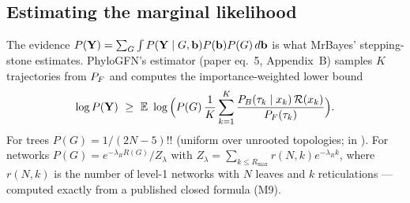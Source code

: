 \subsection{Estimating the marginal likelihood}
The evidence $P(\mathbf{Y})=\sum_G\int P(\mathbf{Y}\mid G,\mathbf{b})P(\mathbf{b})P(G)\,d\mathbf{b}$ is what MrBayes' stepping-stone estimates. PhyloGFN's estimator (paper eq.~5, Appendix~B) samples $K$ trajectories from $P_F$ and computes the importance-weighted lower bound
\begin{equation}\label{eq:mll}
\log P(\bY)\ \ge\ \mathbb E\ \log\Big(P(G)\,\frac1K\sum_{k=1}^K\frac{\PB(\tau_k\mid x_k)\,\R(x_k)}{\PF(\tau_k)}\Big).
\end{equation}
For trees $P(G)=1/(2N-5)!!$ (uniform over unrooted topologies;  in ). For networks $P(G)=e^{-\lambda_RR(G)}/Z_\lambda$ with $Z_\lambda=\sum_{k\le R_{\max}}r(N,k)e^{-\lambda_Rk}$, where $r(N,k)$ is the number of level-1 networks with $N$ leaves and $k$ reticulations --- computed exactly from a published closed formula (M9).
\clearpage
